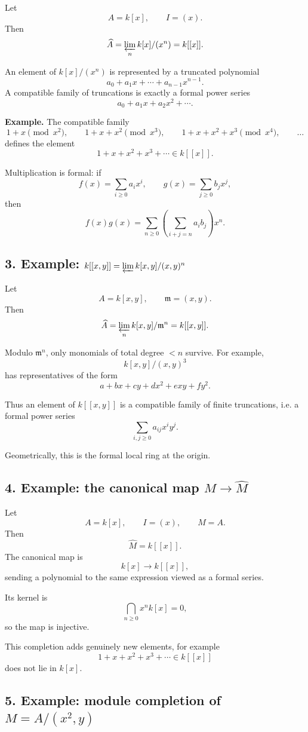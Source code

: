 \documentclass[12pt,a4paper]{article}
\theoremstyle{plain}
\theoremstyle{definition}      %
\begin{document}
Let
\[
A=k[x],\qquad I=(x).
\]
Then
\[
\widehat A=\varprojlim_n k[x]/(x^n)=k[[x]].
\]

An element of \(k[x]/(x^n)\) is represented by a truncated polynomial
\[
a_0+a_1x+\cdots+a_{n-1}x^{n-1}.
\]
A compatible family of truncations is exactly a formal power series
\[
a_0+a_1x+a_2x^2+\cdots.
\]

\textbf{Example.}
The compatible family
\[
1+x \pmod{x^2},
\qquad
1+x+x^2 \pmod{x^3},
\qquad
1+x+x^2+x^3 \pmod{x^4},
\qquad \dots
\]
defines the element
\[
1+x+x^2+x^3+\cdots\in k[[x]].
\]

Multiplication is formal:
if
\[
f(x)=\sum_{i\ge0} a_i x^i,\qquad
g(x)=\sum_{j\ge0} b_j x^j,
\]
then
\[
f(x)g(x)=\sum_{n\ge0}\left(\sum_{i+j=n} a_i b_j\right)x^n.
\]

\subsection*{3. Example: \(k[[x,y]]=\varprojlim k[x,y]/(x,y)^n\)}

Let
\[
A=k[x,y],\qquad \mathfrak m=(x,y).
\]
Then
\[
\widehat A=\varprojlim_n k[x,y]/\mathfrak m^n = k[[x,y]].
\]

Modulo \(\mathfrak m^n\), only monomials of total degree \(<n\) survive. For example,
\[
k[x,y]/(x,y)^3
\]
has representatives of the form
\[
a+bx+cy+dx^2+exy+fy^2.
\]

Thus an element of \(k[[x,y]]\) is a compatible family of finite truncations, i.e. a formal power series
\[
\sum_{i,j\ge0} a_{ij}x^iy^j.
\]

Geometrically, this is the formal local ring at the origin.

\subsection*{4. Example: the canonical map \(M\to \widehat M\)}

Let
\[
A=k[x],\qquad I=(x),\qquad M=A.
\]
Then
\[
\widehat M=k[[x]].
\]
The canonical map is
\[
k[x]\to k[[x]],
\]
sending a polynomial to the same expression viewed as a formal series.

Its kernel is
\[
\bigcap_{n\ge0} x^n k[x]=0,
\]
so the map is injective.

This completion adds genuinely new elements, for example
\[
1+x+x^2+x^3+\cdots \in k[[x]]
\]
does not lie in \(k[x]\).

\subsection*{5. Example: module completion of \(M=A/(x^2,y)\)}
\end{document}
